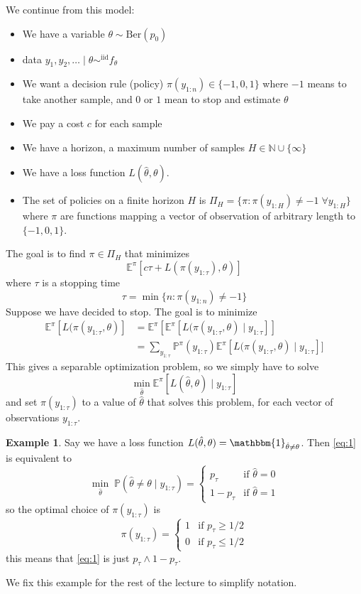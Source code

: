 \documentclass[pdftex,letterpaper,11pt]{article}
\theoremstyle{definition}
\newtheorem{example}{Example}[section]
\theoremstyle{definition}
\theoremstyle{definition}
\newcommand{\ind}{\mathbbm{1}}
\newcommand{\NN}{\mathbb N}
\newcommand{\PP}{\mathbb P}
\newcommand{\EE}{\mathbb E}
\newcommand{\mrm}[1]{\mathrm{#1}}
\begin{document}
We continue from this model:
\begin{itemize}
	\item We have a variable $\theta \sim \mrm{Ber}(p_0)$
	\item data $y_1, y_2, \ldots \mid \theta \sim^{\mrm{iid}} f_\theta$
	\item We want a decision rule (policy) $\pi(y_{1:n}) \in \{-1, 0, 1\}$ where $-1$ means to take another sample, and $0$ or $1$ mean to stop and estimate $\theta$
	\item We pay a cost $c$ for each sample
	\item We have a horizon, a maximum number of samples $H \in \NN \cup \{\infty\}$
	\item We have a loss function $L(\hat \theta, \theta)$.
	\item The set of policies on a finite horizon $H$ is $\Pi_H = \{\pi : \pi(y_{1:H}) \neq -1 \; \forall y_{1:H}\}$ where $\pi$ are functions mapping a vector of observation of arbitrary length to $\{-1, 0, 1\}$.
\end{itemize}
The goal is to find $\pi \in \Pi_H$ that minimizes
\[\EE^\pi[c \tau + L(\pi(y_{1:\tau}), \theta)]\]
where $\tau$ is a stopping time
\[\tau = \min \{n : \pi(y_{1:n}) \neq -1 \}\]
Suppose we have decided to stop. The goal is to minimize
\begin{align*}
	\EE^\pi[L(\pi(y_{1:\tau}, \theta)] & = \EE^\pi[\EE^\pi[L(\pi(y_{1:\tau}, \theta) \mid y_{1:\tau}] ]\\
									   & = \sum_{y_{1:\tau}} \PP^\pi(y_{1:\tau}) \EE^\pi[L(\pi(y_{1:\tau}, \theta) \mid y_{1:\tau}]]
\end{align*}
This gives a separable optimization problem, so we simply have to solve
\begin{equation}\label{eq:1}
\min_{\hat \theta} \EE^\pi[L(\hat \theta, \theta) \mid y_{1:\tau}]
\end{equation}
and set $\pi(y_{1:\tau})$ to a value of $\hat \theta$ that solves this problem, for each vector of observations $y_{1:\tau}$.

\begin{example}
	Say we have a loss function $L(\hat \theta, \theta) = \ind_{\hat \theta \neq \theta}$. Then \ref{eq:1} is equivalent to 
	\[\min_{\hat \theta}\; \PP(\hat \theta \neq \theta \mid y_{1:\tau}) = \begin{cases}
		p_\tau & \mbox{if $\hat \theta = 0$}\\
		1-p_\tau & \mbox{if $\hat \theta = 1$}
	\end{cases}\]
	so the optimal choice of $\pi(y_{1:\tau})$ is
	\[\pi(y_{1:\tau}) = \begin{cases}
		1 & \mbox{if $p_\tau \geq 1/2$}\\
		0 & \mbox{if $p_\tau \leq 1/2$}
	\end{cases}\]
	this means that \ref{eq:1} is just $p_\tau \wedge 1-p_\tau$.
\end{example}
We fix this example for the rest of the lecture to simplify notation.
\end{document}
